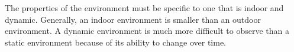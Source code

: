 The properties of the environment must be specific to one that is indoor and dynamic. Generally, an indoor environment is smaller than an outdoor environment. A dynamic environment is much more difficult to observe than a static environment because of its ability to change over time.